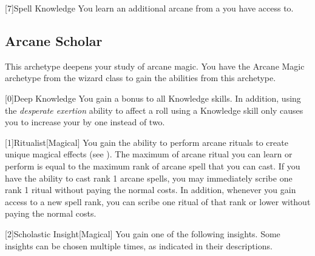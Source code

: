         [7]{Spell Knowledge} You learn an additional arcane  from a  you have access to.

    \newpage
    \subsection{Arcane Scholar}
        This archetype deepens your study of arcane magic.
        You have the Arcane Magic archetype from the wizard class to gain the abilities from this archetype.

        [0]{Deep Knowledge} You gain a  bonus to all Knowledge skills.
        In addition, using the \textit{desperate exertion} ability to affect a roll using a Knowledge skill only causes you to increase your  by one instead of two.

        [1]{Ritualist}[Magical] You gain the ability to perform arcane rituals to create unique magical effects (see ).
        The maximum  of arcane ritual you can learn or perform is equal to the maximum rank of arcane spell that you can cast.
        If you have the ability to cast rank 1 arcane spells, you may immediately scribe one rank 1 ritual without paying the normal costs.
        In addition, whenever you gain access to a new spell rank, you can scribe one ritual of that rank or lower without paying the normal costs.

        [2]{Scholastic Insight}[Magical]
        You gain one of the following insights.
        Some insights can be chosen multiple times, as indicated in their descriptions.

